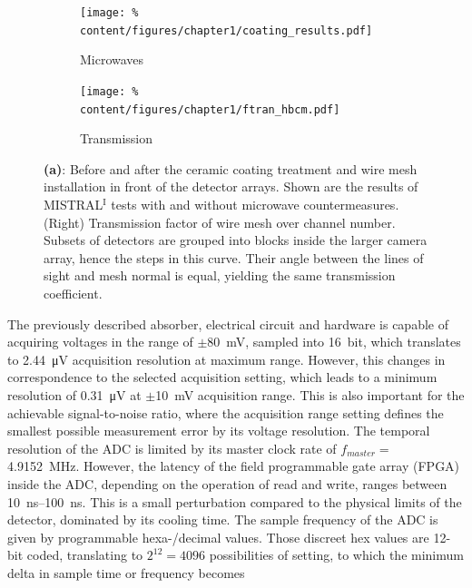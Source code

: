             \begin{figure}[t]%
                \centering%
                \begin{subfigure}{0.46\textwidth}%
                    \texttt{[image: \%
                        content/figures/chapter1/coating\_results.pdf]}%
                    \caption{Microwaves}\label{fig:coating}
                \end{subfigure}%
                \hfill%
                \begin{subfigure}{0.48\textwidth}%
                    \texttt{[image: \%
                        content/figures/chapter1/ftran\_hbcm.pdf]}%
                    \caption{Transmission}\label{fig:ftran}
                \end{subfigure}%
                \caption{\textbf{(a)}: Before and after the ceramic coating treatment and wire mesh installation in front of the detector arrays. Shown are the results of MISTRAL$^{\text{I}}$ tests with and without microwave countermeasures. (Right) Transmission factor of wire mesh over channel number. Subsets of detectors are grouped into blocks inside the larger camera array, hence the steps in this curve. Their angle between the lines of sight and mesh normal is equal, yielding the same transmission coefficient.}\label{fig:coating_ftran}%
            \end{figure}%
%
            The previously described absorber, electrical circuit and hardware is capable of acquiring voltages in the range of $\pm$\SI{80}{\milli\volt}, sampled into \SI{16}{bit}, which translates to \SI{2.44}{\micro\volt} acquisition resolution at maximum range. However, this changes in correspondence to the selected acquisition setting, which leads to a minimum resolution of \SI{0.31}{\micro\volt} at $\pm$\SI{10}{\milli\volt} acquisition range. This is also important for the achievable signal-to-noise ratio, where the acquisition range setting defines the smallest possible measurement error by its voltage resolution. The temporal resolution of the ADC is limited by its master clock rate of $f_{master}=\,$\SI{4.9152}{\mega\hertz}. However, the latency of the field programmable gate array (FPGA) inside the ADC, depending on the operation of read and write, ranges between \SIrange{10}{100}{\nano\second}. This is a small perturbation compared to the physical limits of the detector, dominated by its cooling time. The sample frequency of the ADC is given by programmable hexa-/decimal values. Those discreet hex values are 12-bit coded, translating to $2^{12}=4096$ possibilities of setting, to which the minimum delta in sample time or frequency becomes%
